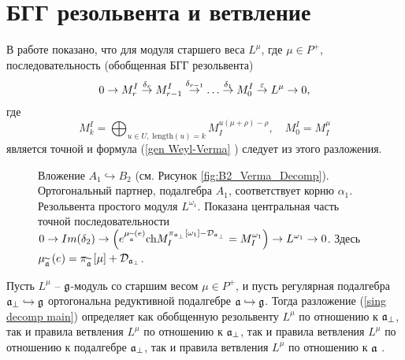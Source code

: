 \section{БГГ резольвента и ветвление}
В работе \cite{lepowsky1977generalization} показано, что для модуля старшего веса $L^{\mu }$, где $\mu \in P^{+}$, последовательность (обобщенная БГГ резольвента)
\begin{equation}
0\rightarrow M_{r}^{I}\overset{\delta _{r}}{\rightarrow }M_{r-1}^{I}\overset{%
\delta _{r-1}}{\rightarrow }\ldots \overset{\delta _{1}}{\rightarrow }%
M_{0}^{I}\overset{\varepsilon }{\rightarrow }L^{\mu }\rightarrow 0,
\label{resolution sequence}
\end{equation}
где
\begin{equation}
M_{k}^{I}=\bigoplus_{u\in U,\;\mathrm{length}\left( u\right)
=k}M_{I}^{u\left( \mu +\rho \right) -\rho },\quad M_{0}^{I}=M_{I}^{\mu }
\label{Verma elements sequence}
\end{equation}
является точной и формула (\ref{gen Weyl-Verma}%
) следует из этого разложения.

\begin{figure}[h!bt]
 \noindent{}
 \caption{Вложение $A_1\hookrightarrow B_2$ (см. Рисунок \ref{fig:B2_Verma_Decomp}). Ортогональный партнер, подалгебра $A_1$, соответствует корню $\alpha_1$.
   Резольвента простого модуля $L^{\omega_1}$. Показана центральная часть точной последовательности
   $0 \to Im(\delta_2) \to \left( e^{\mu _{\widetilde{%
\frak{a}}}\left( e\right) }\mathrm{ch}M_{I}^{\pi _{\afb}\left[ \omega_1 \right] -%
\mathcal{D}_{\afb} }=M^{\omega_1}_{I}\right) \to
   L^{\omega_1}\to 0 $.  Здесь $\mu _{\widetilde{\frak{a}}}\left( e\right) =\pi _{\widetilde{\mathfrak{a}}}\left[ \mu \right] + \mathcal{D}_{\mathfrak{a}_{\perp}}$.
   }
\end{figure}


\begin{statement}
Пусть $L^{\mu }$ --  $\frak{g}$-модуль со старшим весом $\mu \in P^{+}$, и пусть регулярная подалгебра  $\mathfrak{a}_{\perp}\hookrightarrow \frak{g}$ ортогональна редуктивной подалгебре $\frak{a}\hookrightarrow \frak{g}$. Тогда разложение (\ref{sing decomp main}) определяет как обобщенную резольвенту $L^{\mu }$ по отношению к $\mathfrak{a}_{\perp}$, так и правила ветвления $L^{\mu }$ по отношению к $\frak{a}_{\perp }$, так и правила ветвления $L^{\mu }$ по отношению к подалгебре $\frak{a}_{\perp }$, так и правила ветвления $L^{\mu }$ по отношению к $\frak{a}$ .
\end{statement}

